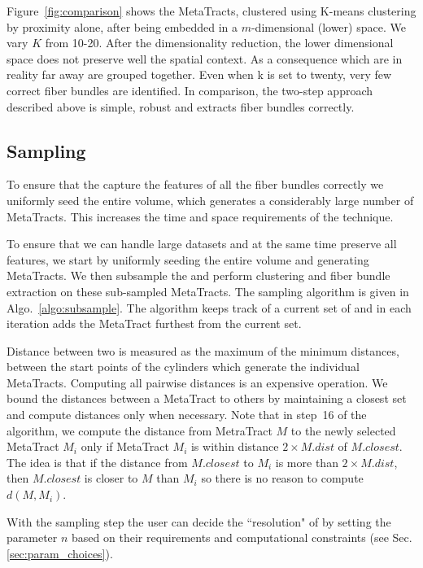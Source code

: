 Figure~\ref{fig:comparison} shows the MetaTracts, clustered using K-means clustering by proximity alone, after being embedded in a $m$-dimensional (lower) space. We vary $K$ from 10-20. After the dimensionality reduction, the lower dimensional space does not preserve well the spatial context. As a consequence \mt which are in reality far away are grouped together. Even when k is set to twenty, very few correct fiber bundles are identified.  In comparison, the two-step approach described above is simple, robust and extracts fiber bundles correctly.
\subsection {Sampling \mt}\label{subsec:sampling_mt}
To ensure that the \mt capture the features of all the fiber bundles correctly we uniformly seed the entire volume, which generates a considerably large number of MetaTracts. This increases the time and space requirements of the technique.  

To ensure that we can handle large datasets and at the same time preserve all features, we start by uniformly seeding the entire volume and generating MetaTracts. We then subsample the \mt and  perform clustering and fiber bundle extraction on these sub-sampled MetaTracts.
The sampling algorithm is given in Algo.~\ref{algo:subsample}. The algorithm  keeps track of a current set of \mt and in each iteration adds the MetaTract furthest from the current set.

Distance between two \mt is measured as the maximum of the minimum distances, between the start points of the cylinders which generate the individual MetaTracts. 
Computing all pairwise distances is an expensive operation. We bound the distances between a MetaTract to others by maintaining a closest set and compute distances only when necessary.
Note that in step~16 of the algorithm,
we compute the distance from MetraTract $M$
to the newly selected MetaTract $M_i$
only if MetaTract $M_i$ is within distance $2 \times M.dist$ of $M.closest$.
The idea is that if the distance from $M.closest$ to $M_i$ 
is more than $2 \times M.dist$, then $M.closest$ is closer to $M$
than $M_i$ so there is no reason to compute $d(M,M_i)$.

With the sampling step the user can decide the ``resolution" of \mt by setting the parameter $n$ based on their requirements and computational constraints (see Sec.\ref{sec:param_choices}).

